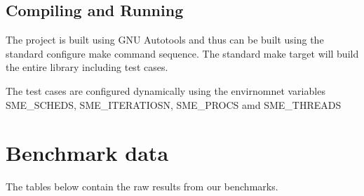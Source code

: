 \section{Compiling and Running}
The project is built using GNU Autotools and thus can be built using
the standard configure make command sequence. The standard make target
will build the entire library including test cases.

The test cases are configured dynamically using the envirnomnet
variables SME\_SCHEDS, SME\_ITERATIOSN, SME\_PROCS amd SME\_THREADS

\chapter{Benchmark data}
\label{chap:benchdata}
The tables below contain the raw results from our benchmarks.



